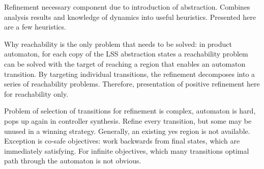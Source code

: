 Refinement necessary component due to introduction of abstraction.
Combines analysis results and knowledge of dynamics into useful heuristics.
Presented here are a few heuristics.

Why reachability is the only problem that needs to be solved: in product automaton, for each copy of the LSS abstraction states a reachability problem can be solved with the target of reaching a region that enables an automaton transition.
By targeting individual transitions, the refinement decomposes into a series of reachability problems.
Therefore, presentation of positive refinement here for reachability only.

Problem of selection of transitions for refinement is complex, automaton is hard, pops up again in controller synthesis.
Refine every transition, but some may be unused in a winning strategy.
Generally, an existing yes region is not available.
Exception is co-safe objectives: work backwards from final states, which are immediately satisfying.
For infinite objectives, which many transitions optimal path through the automaton is not obvious.

